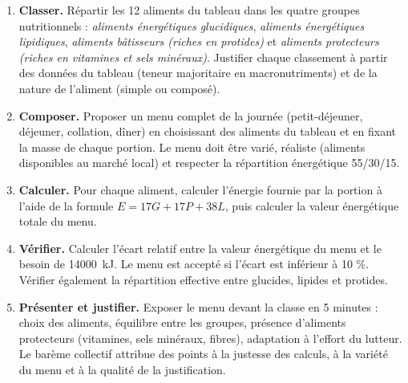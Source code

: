 \documentclass[11pt]{article}
\newcounter{popsec}
\newcounter{popsub}
\newcommand{\courssub}[1]{%
  \stepcounter{popsub}%
  \par\vspace{9pt}\noindent{\popxbold\fontsize{11.5}{13}\selectfont\color{popink}{\color{poporange}\thepopsec.\thepopsub}\hspace{6pt}#1}\par\nopagebreak\vspace{4pt}
}
\begin{document}
\begin{enumerate}
\item \textbf{Classer.} Répartir les 12 aliments du tableau dans les quatre groupes nutritionnels : \emph{aliments énergétiques glucidiques}, \emph{aliments énergétiques lipidiques}, \emph{aliments bâtisseurs (riches en protides)} et \emph{aliments protecteurs (riches en vitamines et sels minéraux)}. Justifier chaque classement à partir des données du tableau (teneur majoritaire en macronutriments) et de la nature de l'aliment (simple ou composé).
\item \textbf{Composer.} Proposer un menu complet de la journée (petit-déjeuner, déjeuner, collation, dîner) en choisissant des aliments du tableau et en fixant la masse de chaque portion. Le menu doit être varié, réaliste (aliments disponibles au marché local) et respecter la répartition énergétique 55/30/15.
\item \textbf{Calculer.} Pour chaque aliment, calculer l'énergie fournie par la portion à l'aide de la formule $E = 17G + 17P + 38L$, puis calculer la valeur énergétique totale du menu.
\item \textbf{Vérifier.} Calculer l'écart relatif entre la valeur énergétique du menu et le besoin de \SI{14000}{kJ}. Le menu est accepté si l'écart est inférieur à 10 \%. Vérifier également la répartition effective entre glucides, lipides et protides.
\item \textbf{Présenter et justifier.} Exposer le menu devant la classe en 5 minutes : choix des aliments, équilibre entre les groupes, présence d'aliments protecteurs (vitamines, sels minéraux, fibres), adaptation à l'effort du lutteur. Le barème collectif attribue des points à la justesse des calculs, à la variété du menu et à la qualité de la justification.
\end{enumerate}

\courssub{Ressources à mobiliser}
\end{document}
